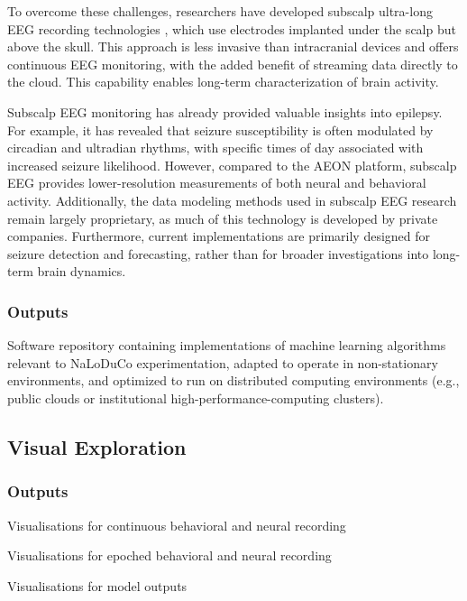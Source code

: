 \documentclass[12pt]{article}
\begin{document}
To overcome these challenges, researchers have developed subscalp ultra-long
EEG recording technologies \citep{duunHenriksenEtAl20}, which use electrodes
implanted under the scalp but above the skull. This approach is less invasive
than intracranial devices and offers continuous EEG monitoring, with the added
benefit of streaming data directly to the cloud. This capability enables
long-term characterization of brain activity.

Subscalp EEG monitoring has already provided valuable insights into epilepsy.
For example, it has revealed that seizure susceptibility is often modulated by
circadian and ultradian rhythms, with specific times of day associated with
increased seizure likelihood. However, compared to the AEON platform, subscalp
EEG provides lower-resolution measurements of both neural and behavioral
activity. Additionally, the data modeling methods used in subscalp EEG research
remain largely proprietary, as much of this technology is developed by private
companies. Furthermore, current implementations are primarily designed for
seizure detection and forecasting, rather than for broader investigations into
long-term brain dynamics.

\subsubsection{Outputs}
\label{sec:outputOfflineAnalysis}

Software repository containing implementations of machine learning algorithms
relevant to NaLoDuCo experimentation, adapted to operate in non-stationary
environments,
and optimized to run on distributed computing environments (e.g., public clouds
or institutional high-performance-computing clusters).

\subsection{Visual Exploration}
\label{sec:visualExploration}

\subsubsection{Outputs}

Visualisations for continuous behavioral and neural recording

Visualisations for epoched behavioral and neural recording

Visualisations for model outputs
\end{document}
